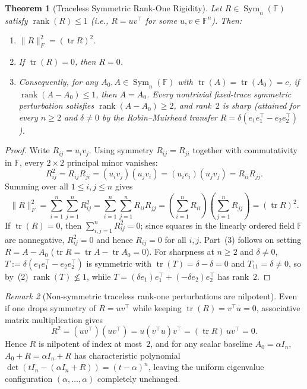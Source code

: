 \documentclass[11pt]{article}
\newtheorem{theorem}{Theorem}[section]
\theoremstyle{definition}
\theoremstyle{remark}
\newtheorem{remark}[theorem]{Remark}
\newcommand{\tr}{\operatorname{tr}}
\newcommand{\rk}{\operatorname{rank}}
\newcommand{\Sym}{\operatorname{Sym}}
\begin{document}
\begin{theorem}[Traceless Symmetric Rank-One Rigidity]
\label{thm:traceless-rank1}
Let $R \in \Sym_n(\mathbb{F})$ satisfy $\rk(R) \le 1$ (i.e., $R = u v^\top$ for some $u, v \in \mathbb{F}^n$). Then:
\begin{enumerate}
  \item $\|R\|_F^2 = (\tr R)^2$.
  \item If $\tr(R) = 0$, then $R = 0$.
  \item Consequently, for any $A_0, A \in \Sym_n(\mathbb{F})$ with $\tr(A) = \tr(A_0) = c$, if $\rk(A - A_0) \le 1$, then $A = A_0$. Every nontrivial fixed-trace symmetric perturbation satisfies $\rk(A - A_0) \ge 2$, and rank~$2$ is sharp (attained for every $n \ge 2$ and $\delta \neq 0$ by the Robin--Muirhead transfer $R = \delta(e_1 e_1^\top - e_2 e_2^\top)$).
\end{enumerate}
\end{theorem}

\begin{proof}
Write $R_{ij} = u_i v_j$. Using symmetry $R_{ij} = R_{ji}$ together with commutativity in $\mathbb{F}$, every $2 \times 2$ principal minor vanishes:
\[
  R_{ij}^2 = R_{ij} R_{ji} = (u_i v_j)(u_j v_i) = (u_i v_i)(u_j v_j) = R_{ii} R_{jj}.
\]
Summing over all $1 \le i, j \le n$ gives
\[
  \|R\|_F^2 = \sum_{i=1}^n \sum_{j=1}^n R_{ij}^2
  = \sum_{i=1}^n \sum_{j=1}^n R_{ii} R_{jj}
  = \left(\sum_{i=1}^n R_{ii}\right)\left(\sum_{j=1}^n R_{jj}\right)
  = (\tr R)^2.
\]
If $\tr(R) = 0$, then $\sum_{i,j=1}^n R_{ij}^2 = 0$; since squares in the linearly ordered field $\mathbb{F}$ are nonnegative, $R_{ij}^2 = 0$ and hence $R_{ij} = 0$ for all $i,j$. Part~(3) follows on setting $R = A - A_0$ ($\tr R = \tr A - \tr A_0 = 0$). For sharpness at $n \ge 2$ and $\delta \neq 0$, $T := \delta(e_1 e_1^\top - e_2 e_2^\top)$ is symmetric with $\tr(T) = \delta - \delta = 0$ and $T_{11} = \delta \neq 0$, so by~(2) $\rk(T) \not\le 1$, while $T = (\delta e_1)e_1^\top + (-\delta e_2)e_2^\top$ has rank~$2$.
\end{proof}

\begin{remark}[Non-symmetric traceless rank-one perturbations are nilpotent]
\label{rem:nilpotent}
Even if one drops symmetry of $R = u v^\top$ while keeping $\tr(R) = v^\top u = 0$, associative matrix multiplication gives
\[
  R^2 = (u v^\top)(u v^\top) = u (v^\top u) v^\top = (\tr R)\, u v^\top = 0.
\]
Hence $R$ is nilpotent of index at most~$2$, and for any scalar baseline $A_0 = \alpha I_n$, $A_0 + R = \alpha I_n + R$ has characteristic polynomial $\det(t I_n - (\alpha I_n + R)) = (t - \alpha)^n$, leaving the uniform eigenvalue configuration $(\alpha, \dots, \alpha)$ completely unchanged.
\end{remark}
\end{document}
